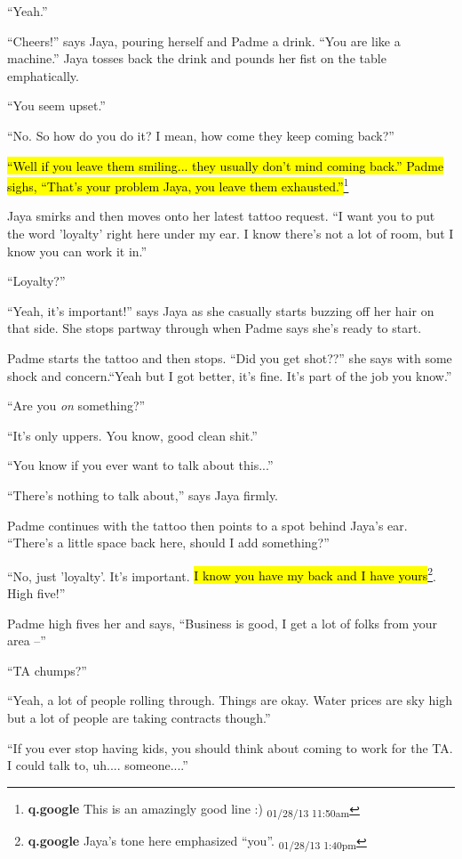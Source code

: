``Yeah.''

``Cheers!'' says Jaya, pouring herself and Padme a drink. ``You are like a machine.''  Jaya tosses back the drink and pounds her fist on the table emphatically.

``You seem upset.''

``No.  So how do you do it?  I mean, how come they keep coming back?''

\hl{``Well if you leave them smiling... they usually don't mind coming back.''  Padme sighs, ``That's your problem Jaya, you leave them exhausted.''}\footnote{\textbf{q.google }This is an amazingly good line :) \textsubscript{01/28/13 11:50am}}

Jaya smirks and then moves onto her latest tattoo request.  ``I want you to put the word 'loyalty' right here under my ear.  I know there's not a lot of room, but I know you can work it in.''

``Loyalty?''

``Yeah, it's important!'' says Jaya as she casually starts buzzing off her hair on that side.  She stops partway through when Padme says she's ready to start.



Padme starts the tattoo and then stops.  ``Did you get shot??'' she says with some shock and concern.``Yeah but I got better, it's fine.  It's part of the job you know.''

``Are you \textit{on }something?''

``It's only uppers.  You know, good clean shit.''

``You know if you ever want to talk about this...''

``There's nothing to talk about,'' says Jaya firmly.

Padme continues with the tattoo then points to a spot behind Jaya's ear.  ``There's a little space back here, should I add something?''

``No, just 'loyalty'.  It's important.  \hl{I know you have my back and I have yours}\footnote{\textbf{q.google }Jaya's tone here emphasized ``you''. \textsubscript{01/28/13 1:40pm}}.  High five!''

Padme high fives her and says, ``Business is good, I get a lot of folks from your area --''

``TA chumps?''

``Yeah, a lot of people rolling through.  Things are okay.  Water prices are sky high but a lot of people are taking contracts though.''

``If you ever stop having kids, you should think about coming to work for the TA.  I could talk to, uh.... someone....''

